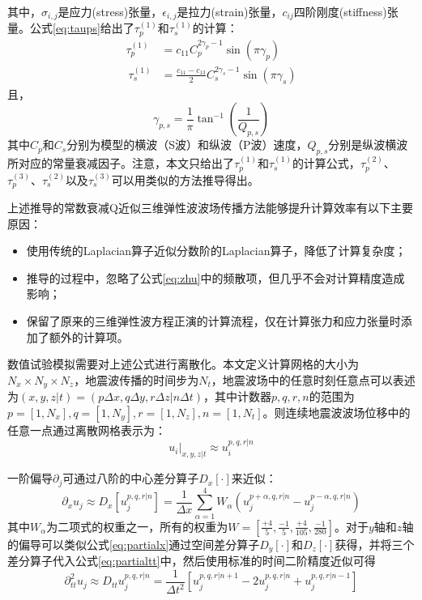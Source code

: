 其中，$\sigma_{i,j}$是应力(stress)张量，$\epsilon_{i,j}$是拉力(strain)张量，$c_{ij}$四阶刚度(stiffness)张量。公式\ref{eq:taups}给出了$\tau_p^{(1)}$和$\tau_s^{(1)}$的计算：
\begin{equation}
\begin{aligned}
  \tau_p^{(1)} &= c_{11}C_p^{2\gamma_p - 1}\sin(\pi \gamma_p) \\
  ~
  \tau_s^{(1)} &= \frac{c_{11} - c_{13}}{2}C_s^{2\gamma_s - 1}\sin(\pi \gamma_s)
\end{aligned}
\label{eq:taups}
\end{equation}
且，
\begin{equation}
  \gamma_{p,s}=\frac{1}{\pi}\tan^{-1}(\frac{1}{Q_{p,s}})
\end{equation}
其中$C_p$和$C_s$分别为模型的横波（S波）和纵波（P波）速度，$Q_{p,s}$分别是纵波横波所对应的常量衰减因子。注意，本文只给出了$\tau_p^{(1)}$和$\tau_s^{(1)}$的计算公式，$\tau_p^{(2)}$、$\tau_p^{(3)}$、$\tau_s^{(2)}$以及$\tau_s^{(3)}$可以用类似的方法推导得出。

上述推导的常数衰减Q近似三维弹性波波场传播方法能够提升计算效率有以下主要原因：
\begin{itemize}
  \item 使用传统的Laplacian算子近似分数阶的Laplacian算子，降低了计算复杂度；
  \item 推导的过程中，忽略了公式\ref{eq:zhu}中的频散项，但几乎不会对计算精度造成影响\cite{shen2015image}；
  \item 保留了原来的三维弹性波方程正演的计算流程，仅在计算张力和应力张量时添加了额外的计算项。
\end{itemize}

数值试验模拟需要对上述公式进行离散化。本文定义计算网格的大小为$N_x \times N_y \times N_z$，地震波传播的时间步为$N_t$，地震波场中的任意时刻任意点可以表述为$(x,y,z|t)=(p\Delta x,q\Delta y, r\Delta z| n\Delta t)$，其中计数器$p,q,r,n$的范围为$p=[1,N_x], q=[1,N_y], r=[1,N_z], n=[1,N_t]$。则连续地震波波场位移中的任意一点通过离散网格表示为：
\begin{equation}
  u_i|_{x,y,z|t} \approx u_i^{p,q,r|n}
\end{equation}

一阶偏导$\partial_j$可通过八阶的中心差分算子$D_x[\cdot]$来近似\cite{trefethen1996finite}：
\begin{equation}
  \partial_x u_j \approx D_x[u_j^{p,q,r|n}] = \frac{1}{\Delta x}\sum_{\alpha=1}^4W_\alpha\left(u_j^{p+\alpha,q,r|n} - u_j^{p-\alpha,q,r|n}\right)
  \label{eq:partialx}
\end{equation}
其中$W_\alpha$为二项式的权重之一，所有的权重为$W=\left[ \frac{+4}{5}, \frac{-1}{5}, \frac{+4}{105}, \frac{-1}{280}\right]$。对于$y$轴和$z$轴的偏导可以类似公式\ref{eq:partialx}通过空间差分算子$D_y[\cdot]$和$D_z[\cdot]$获得，并将三个差分算子代入公式\ref{eq:partialtt}中，然后使用标准的时间二阶精度近似可得
\begin{equation}
  \partial_{tt}^2u_j \approx D_{tt}u_j^{p,q,r|n}=\frac{1}{\Delta t^2}\left[ u_j^{p,q,r|n+1} - 2u_j^{p,q,r|n} + u_j^{p,q,r|n-1} \right]
\end{equation}


